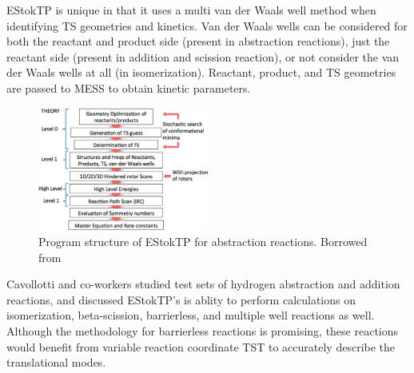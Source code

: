 \documentclass[preprint, 11pt]{elsarticle} %
\begin{document}
EStokTP is unique in that it uses a multi van der Waals well method when identifying TS geometries and kinetics.
Van der Waals wells can be considered for both the reactant and product side (present in abstraction reactions), just the reactant side (present in addition and scission reaction), or not consider the van der Waals wells at all (in isomerization).
Reactant, product, and TS geometries are passed to MESS \cite{MESS:2013} to obtain kinetic parameters.


\begin{figure}[htbp]
    \centering
    \includegraphics[width=0.5\textwidth]{estoktp}
    \caption{Program structure of EStokTP for abstraction reactions. Borrowed from \cite{Cavallotti:2019jctc}}
    \label{fig:estoktp_structure}
\end{figure}

Cavollotti and co-workers studied test sets of hydrogen abstraction and addition reactions, and discussed EStokTP's is ablity to perform calculations on isomerization, beta-scission, barrierless, and multiple well reactions as well.
Although the methodology for barrierless reactions is promising, these reactions would benefit from variable reaction coordinate TST to accurately describe the translational modes.
\end{document}
